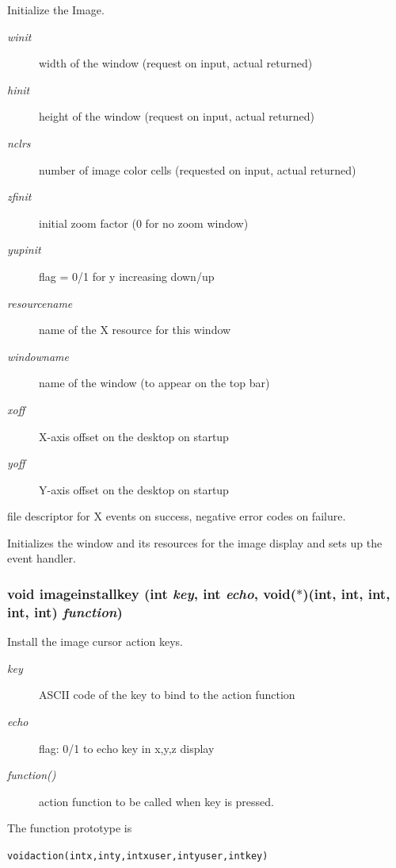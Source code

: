 Initialize the Image. 

\begin{Desc}
\item[Parameters:]
\begin{description}
\item[{\em winit}]width of the window (request on input, actual returned) \item[{\em hinit}]height of the window (request on input, actual returned) \item[{\em nclrs}]number of image color cells (requested on input, actual returned) \item[{\em zfinit}]initial zoom factor (0 for no zoom window) \item[{\em yupinit}]flag = 0/1 for y increasing down/up \item[{\em resourcename}]name of the X resource for this window \item[{\em windowname}]name of the window (to appear on the top bar) \item[{\em xoff}]X-axis offset on the desktop on startup \item[{\em yoff}]Y-axis offset on the desktop on startup\end{description}
\end{Desc}
\begin{Desc}
\item[Returns:]file descriptor for X events on success, negative error codes on failure.\end{Desc}
Initializes the window and its resources for the image display and sets up the event handler. 
\subsubsection{\setlength{\rightskip}{0pt plus 5cm}void imageinstallkey (int {\em key}, int {\em echo}, void($\ast$)(int, int, int, int, int) {\em function})}\label{xtvutils_8c_a173}


Install the image cursor action keys. 

\begin{Desc}
\item[Parameters:]
\begin{description}
\item[{\em key}]ASCII code of the key to bind to the action function \item[{\em echo}]flag: 0/1 to echo key in x,y,z display \item[{\em function()}]action function to be called when key is pressed.\end{description}
\end{Desc}
The function prototype is \small\begin{alltt}
  void action(int x, int y, int xuser, int yuser, int key) 
  \end{alltt}\normalsize 
